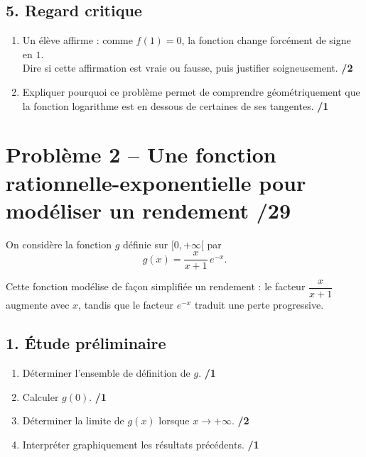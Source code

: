 \documentclass[11pt,a4paper]{article}
\begin{document}
\subsection*{5. Regard critique}
\begin{enumerate}
    \item Un élève affirme : \og comme \(f(1)=0\), la fonction change forcément de signe en \(1\). \fg \\
    Dire si cette affirmation est vraie ou fausse, puis justifier soigneusement. \hfill \textbf{/2}
    \item Expliquer pourquoi ce problème permet de comprendre géométriquement que la fonction logarithme est en dessous de certaines de ses tangentes. \hfill \textbf{/1}
\end{enumerate}

\vspace{1em}

\section*{Problème 2 -- Une fonction rationnelle-exponentielle pour modéliser un rendement \hfill /29}

On considère la fonction \(g\) définie sur \([0,+\infty[\) par
\[
g(x)=\frac{x}{x+1}\,e^{-x}.
\]

Cette fonction modélise de façon simplifiée un rendement : le facteur \(\dfrac{x}{x+1}\) augmente avec \(x\), tandis que le facteur \(e^{-x}\) traduit une perte progressive.

\subsection*{1. Étude préliminaire}
\begin{enumerate}
    \item Déterminer l'ensemble de définition de \(g\). \hfill \textbf{/1}
    \item Calculer \(g(0)\). \hfill \textbf{/1}
    \item Déterminer la limite de \(g(x)\) lorsque \(x\to +\infty\). \hfill \textbf{/2}
    \item Interpréter graphiquement les résultats précédents. \hfill \textbf{/1}
\end{enumerate}
\end{document}
